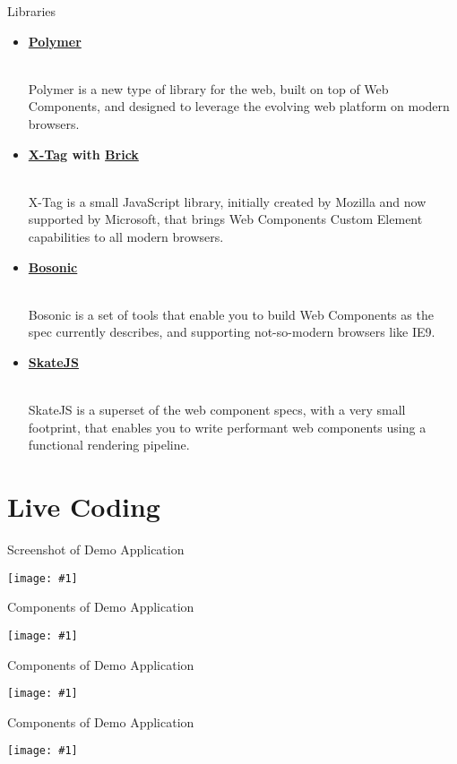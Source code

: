 \documentclass{beamer}
\newcommand{\myfig}[2]{
	\begin{minipage}[c]{\textwidth}
		\begin{center}
			\texttt{[image: \#1]}
		\end{center}
		\vspace{3mm}
	\end{minipage}
}
\newcommand{\bb}[1]{\textbf{#1}}
\newcommand{\slideItems}[1]{
	\begin{itemize}
		#1
	\end{itemize}
}
\newcommand{\slide}[2]{
	\begin{frame}{#1}
		#2
	\end{frame}
}
\begin{document}
\slide{Libraries}{
	\begin{tiny}
		\slideItems{
			\setlength{\itemsep}{12pt}
			\item \begin{normalsize}\bb{\href{https://www.polymer-project.org/}{Polymer}}\end{normalsize} \\
				Polymer is a new type of library for the web, built on top of Web Components, and designed to leverage the evolving web platform on modern browsers.
			\item \begin{normalsize}\bb{\href{https://x-tag.github.io/}{X-Tag} with \href{http://brick.mozilla.io/}{Brick}}\end{normalsize} \\
				X-Tag is a small JavaScript library, initially created by Mozilla and now supported by Microsoft, that brings Web Components Custom Element capabilities to all modern browsers.
			\item \begin{normalsize}\bb{\href{https://bosonic.github.io/}{Bosonic}}\end{normalsize} \\
				Bosonic is a set of tools that enable you to build Web Components as the spec currently describes, and supporting not-so-modern browsers like IE9.
			\item \begin{normalsize}\bb{\href{https://github.com/skatejs/skatejs}{SkateJS}}\end{normalsize} \\
				SkateJS is a superset of the web component specs, with a very small footprint, that enables you to write performant web components using a functional rendering pipeline.
		}
	\end{tiny}
}

\section{Live Coding}

\slide{Screenshot of Demo Application}{
	\myfig{demo_app.png}{1}
}

\slide{Components of Demo Application}{
	\myfig{demo_components_1.png}{1}
}

\slide{Components of Demo Application}{
	\myfig{demo_components_2.png}{1}
}

\slide{Components of Demo Application}{
	\myfig{demo_components_3.png}{1}
}
\end{document}
